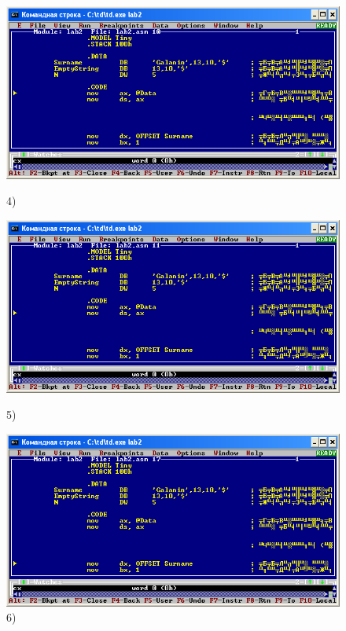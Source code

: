 \begin{figure}[!htp]
    \centering
    \begin{minipage}{0.32\textwidth}
        \centering
        \includegraphics[width=.99\linewidth]
            {../_INCLUDES/task-4-14/4.png}
        \caption{4) }
        \label{fig:task_4_14__4}
    \end{minipage}
    \begin {minipage}{0.32\textwidth}
        \centering
        \includegraphics[width=.99\linewidth]
            {../_INCLUDES/task-4-14/5.png}
        \caption{5) }
        \label{fig:task_4_14__5}
    \end{minipage}
    \begin {minipage}{0.32\textwidth}
        \centering
        \includegraphics[width=.99\linewidth]
            {../_INCLUDES/task-4-14/6.png}
        \caption{6) }
        \label{fig:task_4_14__6}
    \end{minipage}
\end{figure}

